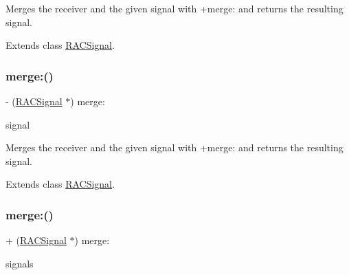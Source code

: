 Merges the receiver and the given signal with {\ttfamily +merge\+:} and returns the resulting signal. 

Extends class \mbox{\hyperlink{interface_r_a_c_signal_aeda66daaf146a2d218ba7819297628a9}{R\+A\+C\+Signal}}.

\mbox{\label{category_r_a_c_signal_07_operations_08_aeda66daaf146a2d218ba7819297628a9}} 
\subsubsection{\texorpdfstring{merge\+:()}{merge:()}\hspace{0.1cm}{\footnotesize\ttfamily [3/6]}}
{\footnotesize\ttfamily -\/ (\mbox{\hyperlink{interface_r_a_c_signal}{R\+A\+C\+Signal}} $\ast$) merge\+: \begin{DoxyParamCaption}\item[{(\mbox{\hyperlink{interface_r_a_c_signal}{R\+A\+C\+Signal}} $\ast$)}]{signal }\end{DoxyParamCaption}}

Merges the receiver and the given signal with {\ttfamily +merge\+:} and returns the resulting signal. 

Extends class \mbox{\hyperlink{interface_r_a_c_signal_aeda66daaf146a2d218ba7819297628a9}{R\+A\+C\+Signal}}.

\mbox{\label{category_r_a_c_signal_07_operations_08_a37d7e9c259ad5253a1f3ff644a86e52b}} 
\subsubsection{\texorpdfstring{merge\+:()}{merge:()}\hspace{0.1cm}{\footnotesize\ttfamily [4/6]}}
{\footnotesize\ttfamily + (\mbox{\hyperlink{interface_r_a_c_signal}{R\+A\+C\+Signal}} $\ast$) merge\+: \begin{DoxyParamCaption}\item[{(id$<$ N\+S\+Fast\+Enumeration $>$)}]{signals }\end{DoxyParamCaption}}

